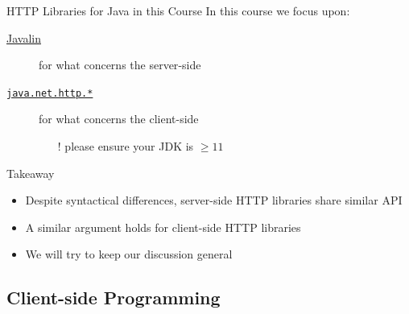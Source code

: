\documentclass[presentation]{beamer}\mode<presentation>{\usetheme{AMSCesenaPurpleAndGold}}
\begin{document}
\begin{frame}{HTTP Libraries for Java in this Course}
    In this course we focus upon:
    \begin{description}
        \item[\href{https://javalin.io/}{Javalin}] for what concerns the \alert{server}-side
        \item[\href{https://docs.oracle.com/en/java/javase/11/docs/api/java.net.http/java/net/http/package-summary.html}{\texttt{java.net.http.*}}] for what concerns the \alert{client}-side
        \begin{itemize}
            \item[!] please ensure your JDK is $\geq 11$
        \end{itemize}
    \end{description}

    \vfill

    \begin{block}{Takeaway}
        \begin{itemize}
            \item Despite syntactical differences, server-side HTTP libraries share similar API
            \item A similar argument holds for client-side HTTP libraries
            \item We will try to keep our discussion general
        \end{itemize}
    \end{block}

\end{frame}

\subsection{Client-side Programming}
\end{document}
